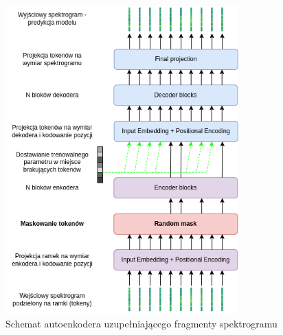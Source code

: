 \begin{figure}
    \centering
    \includegraphics[width=0.8\textwidth]{./images/mae_transformer.png}
    \caption{Schemat autoenkodera uzupełniającego fragmenty spektrogramu}
    \label{fig:mae_transformer}
\end{figure}

